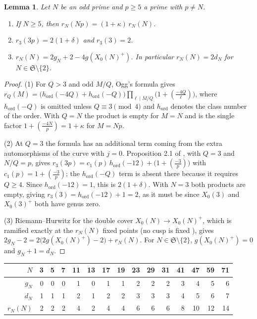 \documentclass[11pt,a4paper]{article}
\newtheorem{lemma}[theorem]{Lemma}
\theoremstyle{remark}\newtheorem{remark}[theorem]{Remark}
\numberwithin{equation}{section}
\newcommand{\leg}[2]{\left(\frac{#1}{#2}\right)}
\newcommand{\ho}{h_{\mathrm{ord}}}
\begin{document}
\begin{lemma}\label{lem:fixed}
Let $N$ be an odd prime and $p\geq5$ a prime with $p\neq N$.
\begin{enumerate}
\item If $N\geq5$, then $r_N(Np)=(1+\kappa)\,r_N(N)$.
\item $r_3(3p)=2(1+\delta)$ and $r_3(3)=2$.
\item $r_N(N)=2g_N+2-4g(X_0(N)^+)$. In particular $r_N(N)=2d_N$ for $N\in\mathfrak S\setminus\{2\}$.
\end{enumerate}
\end{lemma}
\begin{proof}
(1) For $Q>3$ and odd $M/Q$, Ogg's formula \cite[p.~454]{Ogg} gives $r_Q(M)=\bigl(\ho(-4Q)+\ho(-Q)\bigr)\prod_{\ell\mid M/Q}\bigl(1+\leg{-4Q}{\ell}\bigr)$, where $\ho(-Q)$ is omitted unless $Q\equiv3\pmod4$ and $\ho$ denotes the class number of the order. With $Q=N$ the product is empty for $M=N$ and is the single factor $1+\leg{-4N}{p}=1+\kappa$ for $M=Np$.

(2) At $Q=3$ the formula has an additional term coming from the extra automorphisms of the curve with $j=0$. Proposition 2.1 of \cite{IJK}, with $Q=3$ and $N/Q=p$, gives $r_3(3p)=c_1(p)\,\ho(-12)+\bigl(1+\leg{-3}{p}\bigr)$ with $c_1(p)=1+\leg{-3}{p}$; the $\ho(-Q)$ term is absent there because it requires $Q\geq4$. Since $\ho(-12)=1$, this is $2(1+\delta)$. With $N=3$ both products are empty, giving $r_3(3)=\ho(-12)+1=2$, as it must be since $X_0(3)$ and $X_0(3)^+$ both have genus zero.

(3) Riemann--Hurwitz for the double cover $X_0(N)\to X_0(N)^+$, which is ramified exactly at the $r_N(N)$ fixed points (no cusp is fixed \cite[Proposition 3]{Ogg}), gives $2g_N-2=2\bigl(2g(X_0(N)^+)-2\bigr)+r_N(N)$. For $N\in\mathfrak S\setminus\{2\}$, $g(X_0(N)^+)=0$ and $g_N+1=d_N$.
\end{proof}

\begin{center}
\begin{tabular}{rrrrrrrrrrrrrrr}\toprule
$N$ & 3 & 5 & 7 & 11 & 13 & 17 & 19 & 23 & 29 & 31 & 41 & 47 & 59 & 71\\\midrule
$g_N$ & 0 & 0 & 0 & 1 & 0 & 1 & 1 & 2 & 2 & 2 & 3 & 4 & 5 & 6\\
$d_N$ & 1 & 1 & 1 & 2 & 1 & 2 & 2 & 3 & 3 & 3 & 4 & 5 & 6 & 7\\
$r_N(N)$ & 2 & 2 & 2 & 4 & 2 & 4 & 4 & 6 & 6 & 6 & 8 & 10 & 12 & 14\\\bottomrule
\end{tabular}
\end{center}
\end{document}
